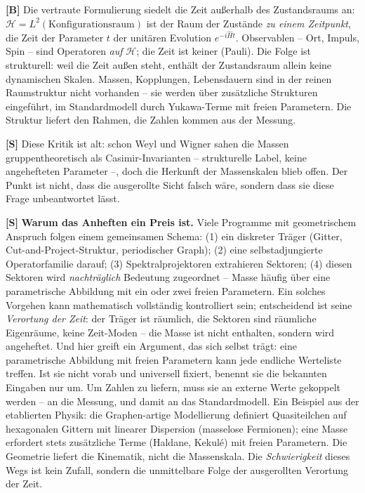 \textbf{[B]} Die vertraute Formulierung siedelt die Zeit außerhalb des
Zustandsraums an: $\mathcal H = L^2(\text{Konfigurationsraum})$ ist der Raum der
Zustände \emph{zu einem Zeitpunkt}, die Zeit der Parameter $t$ der unitären
Evolution $e^{-i\hat H t}$. Observablen -- Ort, Impuls, Spin -- sind Operatoren
\emph{auf} $\mathcal H$; die Zeit ist keiner (Pauli). Die Folge ist strukturell:
weil die Zeit außen steht, enthält der Zustandsraum allein keine dynamischen
Skalen. Massen, Kopplungen, Lebensdauern sind in der reinen Raumstruktur nicht
vorhanden -- sie werden über zusätzliche Strukturen eingeführt, im Standardmodell
durch Yukawa-Terme mit freien Parametern. Die Struktur liefert den Rahmen, die
Zahlen kommen aus der Messung.

\textbf{[S]} Diese Kritik ist alt: schon Weyl und Wigner sahen die Massen
gruppentheoretisch als Casimir-Invarianten -- strukturelle Label, keine
angehefteten Parameter --, doch die Herkunft der Massenskalen blieb offen. Der
Punkt ist nicht, dass die ausgerollte Sicht falsch wäre, sondern dass sie diese
Frage unbeantwortet lässt.

\textbf{[S]} \textbf{Warum das Anheften ein Preis ist.} Viele Programme mit
geometrischem Anspruch folgen einem gemeinsamen Schema: (1) ein diskreter Träger
(Gitter, Cut-and-Project-Struktur, periodischer Graph); (2) eine
selbstadjungierte Operatorfamilie darauf; (3) Spektralprojektoren extrahieren
Sektoren; (4) diesen Sektoren wird \emph{nachträglich} Bedeutung zugeordnet --
Masse häufig über eine parametrische Abbildung mit ein oder zwei freien
Parametern. Ein solches Vorgehen kann mathematisch vollständig kontrolliert sein;
entscheidend ist seine \emph{Verortung der Zeit}: der Träger ist räumlich, die
Sektoren sind räumliche Eigenräume, keine Zeit-Moden -- die Masse ist nicht
enthalten, sondern wird angeheftet. Und hier greift ein Argument, das sich selbst
trägt: eine parametrische Abbildung mit freien Parametern kann jede endliche
Werteliste treffen. Ist sie nicht vorab und universell fixiert, benennt sie die
bekannten Eingaben nur um. Um Zahlen zu liefern, muss sie an externe Werte
gekoppelt werden -- an die Messung, und damit an das Standardmodell. Ein Beispiel
aus der etablierten Physik: die Graphen-artige Modellierung definiert
Quasiteilchen auf hexagonalen Gittern mit linearer Dispersion (masselose
Fermionen); eine Masse erfordert stets zusätzliche Terme (Haldane, Kekulé) mit
freien Parametern. Die Geometrie liefert die Kinematik, nicht die Massenskala. Die
\emph{Schwierigkeit} dieses Wegs ist kein Zufall, sondern die unmittelbare Folge
der ausgerollten Verortung der Zeit.

